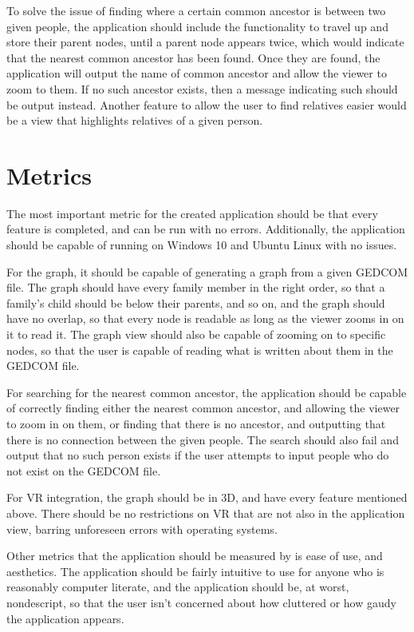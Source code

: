 \documentclass[onecolumn, draftclsnofoot,10pt, compsoc]{IEEEtran}
\begin{document}
To solve the issue of finding where a certain common ancestor is between two given people, the application should include the functionality to travel up and store their parent nodes, until a parent node appears twice, which would indicate that the nearest common ancestor has been found. Once they are found, the application will output the name of common ancestor and allow the viewer to zoom to them. If no such ancestor exists, then a message indicating such should be output instead. Another feature to allow the user to find relatives easier would be a view that highlights relatives of a given person.


\section{Metrics}

The most important metric for the created application should be that every feature is completed, and can be run with no errors. Additionally, the application should be capable of running on Windows 10 and Ubuntu Linux with no issues.

For the graph, it should be capable of generating a graph from a given GEDCOM file. The graph should have every family member in the right order, so that a family's child should be below their parents, and so on, and the graph should have no overlap, so that every node is readable as long as the viewer zooms in on it to read it. The graph view should also be capable of zooming on to specific nodes, so that the user is capable of reading what is written about them in the GEDCOM file.

For searching for the nearest common ancestor, the application should be capable of correctly finding either the nearest common ancestor, and allowing the viewer to zoom in on them, or finding that there is no ancestor, and outputting that there is no connection between the given people. The search should also fail and output that no such person exists if the user attempts to input people who do not exist on the GEDCOM file.

For VR integration, the graph should be in 3D, and have every feature mentioned above. There should be no restrictions on VR that are not also in the application view, barring unforeseen errors with operating systems.

Other metrics that the application should be measured by is ease of use, and aesthetics. The application should be fairly intuitive to use for anyone who is reasonably computer literate, and the application should be, at worst, nondescript, so that the user isn't concerned about how cluttered or how gaudy the application appears.
\end{document}

